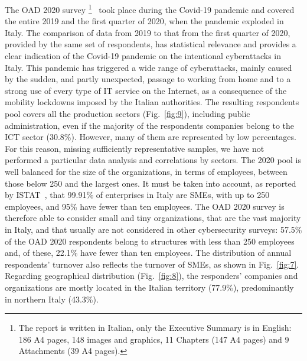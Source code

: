 \documentclass{easychair}
\begin{document}
The OAD 2020 survey
\footnote{The report is written in Italian,
  only the Executive Summary is in English: 186 A4 pages, 148 images and graphics, 11 Chapters
  (147 A4 pages) and 9 Attachments (39 A4 pages).}~\cite{oad20}
took place during the
Covid-19 pandemic and covered the entire 2019 and the first quarter
of 2020, when the pandemic exploded in Italy. The comparison of data from 2019 to that
from the first quarter of 2020, provided by the same set of respondents,
has statistical relevance and provides a 
clear indication of the Covid-19 pandemic on the intentional cyberattacks in Italy.
This pandemic has triggered a wide range of cyberattacks, mainly 
caused by the sudden, and partly unexpected, passage to working from home
and to a strong use of every type of IT service on the Internet, as a consequence
of the mobility lockdowns imposed by the Italian authorities. The resulting respondents pool
covers all the production sectors (Fig.~\ref{fig:9}), including public administration,
even if the majority of the respondents companies belong to the ICT sector (30.8\%).
However, many of them are represented by low percentages. For this reason, missing sufficiently
representative samples, we have not performed a particular data analysis and correlations by sectors.
The 2020 pool is well balanced for the size of the organizations, in terms
of employees, between those below 250 and the largest ones. It must be taken into account,
as reported by ISTAT~\cite{istat21}, that 99.91\%
of enterprises in Italy are SMEs, with up to 250 employees, and 95\% have fewer than ten employees.
The OAD 2020 survey is therefore able to consider small and 
tiny organizations, that are the vast majority in Italy, and that usually
are not considered in other cybersecurity surveys: 57.5\% of the OAD 2020 respondents
belong to structures with less than 250 employees and, of these, 22.1\% have fewer than ten
employees. The distribution of annual respondents' turnover also reflects the turnover of SMEs,
as shown in Fig.~\ref{fig:7}. Regarding geographical distribution (Fig.~\ref{fig:8}),
the responders' companies and organizations are mostly located in the Italian territory (77.9\%),
predominantly in northern Italy (43.3\%).
\end{document}
